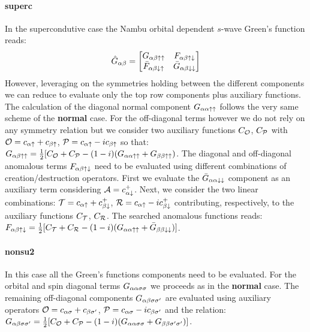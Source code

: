 \documentclass[edipack2.tex]{subfiles}
\begin{document}
\paragraph{{\bf superc}}
In the supercondutive case the Nambu orbital
dependent $s$-wave Green's function reads:
\begin{equation}
  \label{GFnambu}
  \hat{G}_{\alpha\beta} =
  \begin{bmatrix}
    G_{\alpha\beta\uparrow\uparrow} & F_{\alpha\beta\uparrow\downarrow} \\
    \bar{F}_{\alpha\beta\downarrow\uparrow} & \bar{G}_{\alpha\beta\downarrow\downarrow}
  \end{bmatrix}  
\end{equation}
However, leveraging on the symmetries holding between the different
components we can reduce to evaluate only the top row components plus
auxiliary functions.
The calculation of the diagonal normal component $G_{\alpha\alpha\uparrow\uparrow}$ follows the
very same scheme of the {\bf normal} case. For the off-diagonal terms
however we do not rely on any symmetry relation but we consider 
two auxiliary functions $C_{\cal O}$, $C_{\cal P}$ with ${\cal O}=c_{\alpha\uparrow} +
c_{\beta\uparrow}$, ${\cal P}=c_{\alpha\uparrow} -ic_{\beta\uparrow}$ so that:
$G_{\alpha\beta\uparrow\uparrow}=\tfrac{1}{2}[C_{\cal O} + C_{\cal P} -
(1-i)(G_{\alpha\alpha\uparrow\uparrow}+G_{\beta\beta\uparrow\uparrow})$.
The diagonal and off-diagonal anomalous terms $F_{\alpha\beta\uparrow\downarrow}$ need to
be evaluated using different combinations of creation/destruction
operators. First we evaluate the $\bar{G}_{\alpha\alpha\downarrow\downarrow}$ component as
an auxiliary term considering ${\cal A}=c^+_{\alpha\downarrow}$. 
Next, we consider the two linear combinations:
${\cal T} = c_{\alpha\uparrow} + c^+_{\beta\downarrow}$, ${\cal R}=c_{\alpha\uparrow} -i c^+_{\beta\downarrow}$
contributing, respectively, to the auxiliary functions $C_{\cal T}$,
$C_{\cal R}$. The searched anomalous functions reads:
$F_{\alpha\beta\uparrow\downarrow} = \tfrac{1}{2}[ C_{\cal T} + C_{\cal R} - (1-i)(G_{\alpha\alpha\uparrow\uparrow} +
\bar{G}_{\beta\beta\downarrow\downarrow})]$. 


\paragraph{{\bf nonsu2}}
In this case all the Green's functions components need
to be evaluated. For the orbital and spin diagonal terms
$G_{\alpha\alpha\sigma\sigma}$  we proceeds as in the {\bf normal} case.
The remaining  off-diagonal components $G_{\alpha\beta\sigma\sigma'}$ are
evaluated using auxiliary operators ${\cal O}=c_{\alpha\sigma}+c_{\beta\sigma'}$,
${\cal P}=c_{\alpha\sigma}-ic_{\beta\sigma'}$ and the relation:
$G_{\alpha\beta\sigma\sigma'}=\tfrac{1}{2}[C_{\cal O}+C_{\cal P} -
(1-i)(G_{\alpha\alpha\sigma\sigma}+G_{\beta\beta\sigma'\sigma'})]$.
\end{document}
